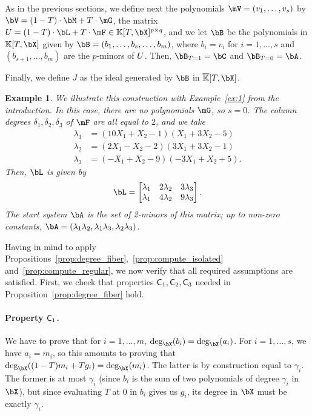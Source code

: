 \documentclass[12pt]{article}
\newtheorem{example}[definition]{Example}
\begin{document}
As in the previous sections, we define next the polynomials
$\mV=(v_1,\dots,v_s)$ by $\bV = (1-T) \cdot \bM + T \cdot \mG$, the
matrix $\mU=(1-T)\cdot \bL + T \cdot \mF \in \KK[T,\bX]^{p\times q}$,
and we let $\bB$ be the polynomials in $\KK[T,\bX]$ given by
$\bB=(b_1,\dots,b_s,\dots,b_m)$, where $b_i=v_i$ for $i=1,\dots,s$ and
$(b_{s+1},\dots,b_{m})$ are the $p$-minors of ${U}$.  Then, $\bB_{T=1}=\bC$ and $\bB_{T=0}=\bA$.

Finally, we define $J$ as the ideal generated by $\bB$ in
$\KKbar[T,\bX]$.
\begin{example}\label{ex:coldeg}
  We illustrate this construction with Example~\ref{ex:1} from the
  introduction. In this case, there are no polynomials $\mG$, so
  $s=0$. The column degrees $\delta_1,\delta_2,\delta_3$ of $\mF$
  are all equal to $2$, and we take
  \begin{align*}
    \lambda_1 &= (10X_1+X_2-1)(X_1+3X_2-5)\\
    \lambda_2 &= (2X_1-X_2-2)(3X_1+3X_2-1)\\
    \lambda_3 &= (-X_1+X_2-9)(-3X_1+X_2+5).
  \end{align*}
Then, $\bL$ is given by
\[\bL=\begin{bmatrix} 
\lambda_1 & 2 \lambda_2 & 3\lambda_3 \\
\lambda_1 & 4 \lambda_2 & 9\lambda_3 
\end{bmatrix}.\]
The start system $\bA$ is the set of 2-minors of this matrix;
up to non-zero constants, $\bA=(\lambda_1\lambda_2, \lambda_1\lambda_3, \lambda_2\lambda_3)$.
\end{example}




Having in mind to apply
Propositions~\ref{prop:degree_fiber},~\ref{prop:compute_isolated}
and~\ref{prop:compute_regular}, we now verify that all required
assumptions are satisfied. First, we check that properties
$\mathsf{C}_1,\mathsf{C}_2,\mathsf{C}_3$ needed in
Proposition~\ref{prop:degree_fiber} hold.

\paragraph{Property $\mathsf{C}_1$.} We have to prove that for $i=1,\dots,m$,
$\deg_\bX(b_i)=\deg_\bX(a_i)$. 
For $i=1,\dots,s$, we have $a_i=m_i$, so
this amounts to proving that $\deg_\bX((1-T) m_i +
T g_i)=\deg_\bX(m_i)$. The latter is by construction equal to
$\gamma_i$. The former is at most $\gamma_i$ (since $b_i$ is the sum
of two polynomials of degree $\gamma_i$ in $\bX$), but since
evaluating $T$ at $0$ in $b_i$ gives us $g_i$, its degree in $\bX$
must be exactly $\gamma_i$.
\end{document}
